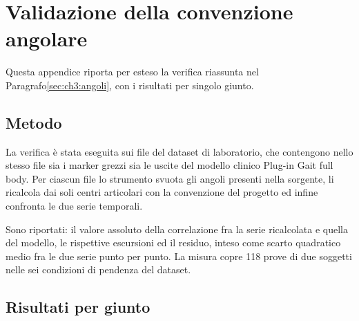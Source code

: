 \chapter{Validazione della convenzione angolare}
\label{app:validazione}

Questa appendice riporta per esteso la verifica riassunta nel
Paragrafo\ref{sec:ch3:angoli}, con i risultati per singolo giunto.

\section{Metodo}
\label{app:val:metodo}

La verifica è stata eseguita sui file del dataset di
laboratorio\cite{vielemeyer2026}, che contengono nello stesso file sia i marker
grezzi sia le uscite del modello clinico Plug-in Gait full body. Per ciascun file
lo strumento svuota gli angoli presenti nella sorgente, li ricalcola dai soli
centri articolari con la convenzione del progetto ed infine confronta le due serie
temporali.

Sono riportati: il valore assoluto della correlazione fra la
serie ricalcolata e quella del modello, le rispettive escursioni ed il residuo,
inteso come scarto quadratico medio fra le due serie punto per punto. La misura
copre 118 prove di due soggetti nelle sei condizioni di pendenza del dataset.

\section{Risultati per giunto}
\label{app:val:risultati}

